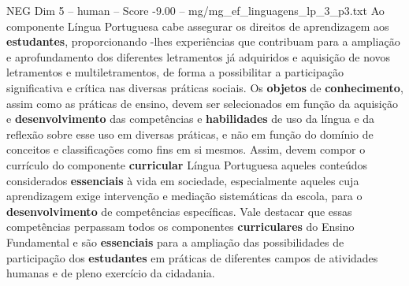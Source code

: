 \begin{textsample}{NEG Dim 5 – human – Score -9.00 – mg/mg\_ef\_linguagens\_lp\_3\_p3.txt}  \label{ex:f5_neg_016}
Ao componente Língua Portuguesa cabe assegurar os direitos de aprendizagem aos \textbf{estudantes}, proporcionando -lhes experiências que contribuam para a ampliação e aprofundamento dos diferentes letramentos já adquiridos e aquisição de novos letramentos e multiletramentos, de forma a possibilitar a participação significativa e crítica nas diversas práticas sociais.
Os \textbf{objetos} de \textbf{conhecimento}, assim como as práticas de ensino, devem ser selecionados em função da aquisição e \textbf{desenvolvimento} das competências e \textbf{habilidades} de uso da língua e da reflexão sobre esse uso em diversas práticas, e não em função do domínio de conceitos e classificações como fins em si mesmos.
Assim, devem compor o currículo do componente \textbf{curricular} Língua Portuguesa aqueles conteúdos considerados \textbf{essenciais} à vida em sociedade, especialmente aqueles cuja aprendizagem exige intervenção e mediação sistemáticas da escola, para o \textbf{desenvolvimento} de competências específicas.
Vale destacar que essas competências perpassam todos os componentes \textbf{curriculares} do Ensino Fundamental e são \textbf{essenciais} para a ampliação das possibilidades de participação dos \textbf{estudantes} em práticas de diferentes campos de atividades humanas e de pleno exercício da cidadania.

\end{textsample}
